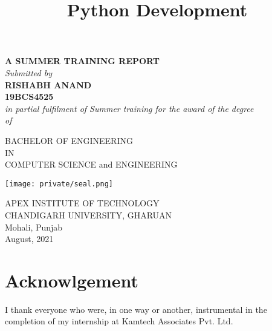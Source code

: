 \documentclass[14pt]{extarticle}
\title{Python Development}
\author{}
\date{}
\newcommand\frontmatter{
    \cleardoublepage
    \pagenumbering{roman}
}
\begin{document}
\frontmatter

\maketitle

\vspace{-5em}

\begin{center}
    \singlespacing
\textbf {A SUMMER TRAINING REPORT} \\
\emph {Submitted by} \\
\textbf {RISHABH ANAND} \\
\textbf {19BCS4525 }   \\

\vspace{1cm}
\onehalfspacing
\emph {in partial fulfilment of Summer training for the award of the degree} \\
\emph {of} \\

\vspace{1.5cm}
\singlespacing

BACHELOR OF ENGINEERING \\
IN \\
COMPUTER SCIENCE and ENGINEERING\\

\vspace{1cm}

\texttt{[image: private/seal.png]}

\vspace{1cm}
\singlespacing

APEX INSTITUTE OF TECHNOLOGY\\
CHANDIGARH UNIVERSITY, GHARUAN\\
Mohali, Punjab \\

\onehalfspacing
August, 2021

\end{center}
\restoregeometry

\newpage
{}


\newpage
{}
\section*{Acknowlgement}
\par I thank everyone who were, in one way or another, instrumental in the completion of my internship at Kamtech Associates Pvt. Ltd.
\end{document}
